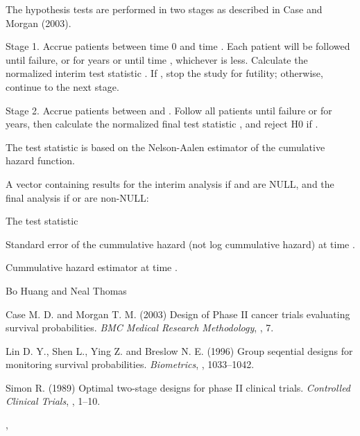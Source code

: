 \begin{Details}\relax
The hypothesis tests are performed in two stages as described in Case
and Morgan (2003).

Stage 1. Accrue patients between time 0 and time . Each
patient will be followed until failure, or for  years or until
time , whichever is less. Calculate the normalized interim test
statistic . If , stop the study for futility;
otherwise, continue to the next stage.

Stage 2. Accrue patients between  and . Follow all
patients until failure or for  years, then calculate the
normalized final test statistic , and reject H0 if
.

The test statistic is based on the Nelson-Aalen estimator of the
cumulative hazard function.
\end{Details}
\begin{Value}
A vector containing results for the interim analysis if  and
 are NULL, and the 
final analysis if  or  are non-NULL:

\begin{ldescription}
\item[\code{z}] The test statistic
\item[\code{se}] Standard error of the cummulative hazard (not log
cummulative hazard) at time .
\item[\code{cumL}] Cummulative hazard estimator at time .
\end{ldescription}
\end{Value}
\begin{Author}\relax
Bo Huang  and Neal Thomas
\end{Author}
\begin{References}\relax
Case M. D. and Morgan T. M. (2003) Design of Phase II cancer trials
evaluating survival probabilities. \emph{BMC Medical Research
Methodology}, , 7.

Lin D. Y., Shen L., Ying Z. and Breslow N. E. (1996) Group seqential
designs for monitoring survival probabilities. \emph{Biometrics},
, 1033--1042.

Simon R. (1989) Optimal two-stage designs for phase II clinical
trials. \emph{Controlled Clinical Trials}, , 1--10.
\end{References}
\begin{SeeAlso}\relax
{}, 
\end{SeeAlso}
